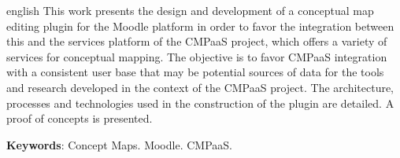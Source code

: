 \documentclass[
	12pt,				%
	openright,			%
	oneside,			%
	a4paper,			%
	english,			%
	french,				%
	spanish,			%
	brazil				%
	]{abntex2}
\begin{document}
\begin{resumo}[Abstract]
  \begin{otherlanguage*}{english}
    This work presents the design and development of a conceptual map editing plugin for the Moodle platform in order to favor the integration between this and the services platform of the CMPaaS project, which offers a variety of services for conceptual mapping. The objective is to favor CMPaaS integration with a consistent user base that may be potential sources of data for the tools and research developed in the context of the CMPaaS project. The architecture, processes and technologies used in the construction of the plugin are detailed. A proof of concepts is presented.
    \vspace{\onelineskip}
 
    \noindent 
    \textbf{Keywords}: Concept Maps. Moodle. CMPaaS.
  \end{otherlanguage*}
\end{resumo}


\listoffigures*
\cleardoublepage




\tableofcontents*
\cleardoublepage



\textual
\end{document}
